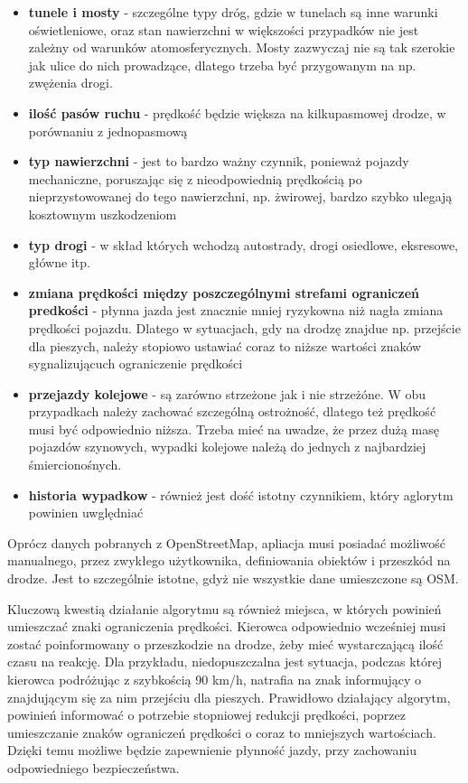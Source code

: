 \begin{itemize}
\item \textbf{tunele i mosty} - szczególne typy dróg, gdzie w tunelach są inne warunki oświetleniowe, oraz stan nawierzchni w większości przypadków nie jest zależny od warunków atomosferycznych. Mosty zazwyczaj nie są tak szerokie jak ulice do nich prowadzące, dlatego trzeba być przygowanym na np. zwężenia drogi.
\item \textbf{ilość pasów ruchu} - prędkość będzie większa na kilkupasmowej drodze, w porównaniu z jednopasmową
\item \textbf{typ nawierzchni} - jest to bardzo ważny czynnik, ponieważ pojazdy mechaniczne, poruszając się z nieodpowiednią prędkością po nieprzystowowanej do tego nawierzchni, np. żwirowej, bardzo szybko ulegają kosztownym uszkodzeniom 
\item \textbf{typ drogi} - w skład których wchodzą autostrady, drogi osiedlowe, eksresowe, główne itp.
\item \textbf{zmiana prędkości między poszczególnymi strefami ograniczeń predkości} - płynna jazda jest znacznie mniej ryzykowna niż nagła zmiana prędkości pojazdu. Dlatego w sytuacjach, gdy na drodzę znajdue np. przejście dla pieszych, należy stopiowo ustawiać coraz to niższe wartości znaków sygnalizującuch ograniczenie prędkości
\item \textbf{przejazdy kolejowe} - są zarówno strzeżone jak i nie strzeżóne. W obu przypadkach należy zachować szczególną ostrożność, dlatego też prędkość musi być odpowiednio niższa. Trzeba mieć na uwadze, że przez dużą masę pojazdów szynowych, wypadki kolejowe należą do jednych z najbardziej śmiercionośnych.
\item \textbf{historia wypadkow} - również jest dość istotny czynnikiem, który aglorytm powinien uwględniać
\end{itemize}

Oprócz danych pobranych z OpenStreetMap, apliacja musi posiadać możliwość manualnego, przez zwykłego użytkownika, definiowania obiektów i przeszkód na drodze. Jest to szczególnie istotne, gdyż nie wszystkie dane umieszczone są OSM. 


Kluczową kwestią działanie algorytmu są również miejsca, w których powinień umieszczać znaki ograniczenia prędkości. Kierowca odpowiednio wcześniej musi zostać poinformowany o przeszkodzie na drodze, żeby mieć wystarczającą ilość czasu na reakcję. Dla przykładu, niedopuszczalna jest sytuacja, podczas której kierowca podróżując z szybkością 90 km/h, natrafia na znak informujący o znajdującym się za nim przejściu dla pieszych. Prawidłowo działający algorytm, powinień informować o potrzebie stopniowej redukcji prędkości, poprzez umieszczanie znaków ograniczeń prędkości o coraz to mniejszych wartościach. Dzięki temu możliwe będzie zapewnienie płynność jazdy, przy zachowaniu odpowiedniego bezpieczeństwa.


